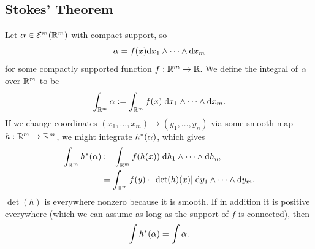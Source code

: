 \documentclass{amsart}
\begin{document}
\subsection{Stokes' Theorem} Let $\alpha\in \mathcal{E}^m(\mathbb{R}^m)$ with compact support, so 
$$
\alpha = f(x) \textrm{d} x_1 \wedge \cdots \wedge \textrm{d} x_m
$$
for some compactly supported function $f:\mathbb{R}^m\to \mathbb{R}$. We define the integral of $\alpha$ over $\mathbb{R}^m$ to be 
$$
\int_{\mathbb{R}^m} \alpha := \int_{\mathbb{R}^m}f(x) \; \textrm{d} x_1\wedge\cdots\wedge \textrm{d} x_m.
$$
If we change coordinates $(x_1,\dots,x_m)\to (y_1,\dots,y_n)$ via some smooth map $h: \mathbb{R}^m\to \mathbb{R}^m$, we might integrate $h^*(\alpha)$, which gives
\begin{align*}
\int_{\mathbb{R}^m}h^*(\alpha) &:= \int_{\mathbb{R}^m} f(h(x)) \; \textrm{d} h_1 \wedge \cdots \wedge \textrm{d} h_m\\
&= \int_{\mathbb{R}^m} f(y) \cdot |\det(h)(x)|\; \textrm{d} y_1\wedge \cdots \wedge \textrm{d} y_m.
\end{align*}
$\det(h)$ is everywhere nonzero because it is smooth. If in addition it is positive everywhere (which we can assume as long as the support of $f$ is connected), then 
$$
\int h^*(\alpha) = \int \alpha.
$$
\end{document}

